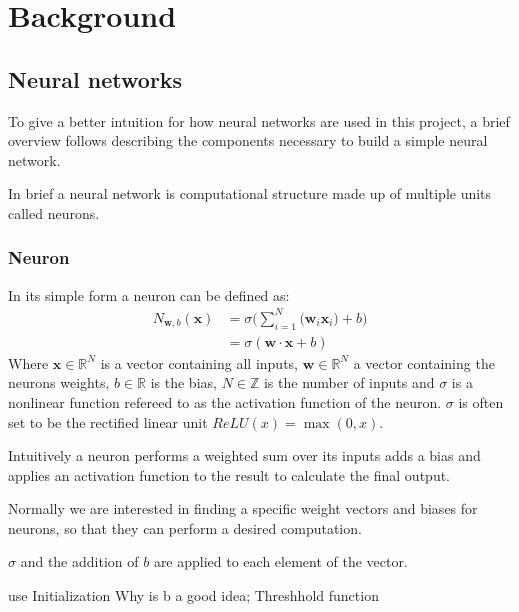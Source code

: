 \newcommand{\neuronSum}[1][N]{
	\sigma\Bigg(\sum_{i=1}^{#1}{\Big(\boldsymbol{w}_i \boldsymbol{x}_i\Big)} + b\Bigg)
}

\chapter{Background}
\section{Neural networks}
To give a better intuition for how neural networks are used in this project, a brief overview follows describing the components necessary to build a simple neural network.

In brief a neural network is computational structure made up of multiple units called neurons.

\subsection{Neuron}
In its simple form a neuron can be defined as:
\begin{equation}
\begin{split}
	N_{\boldsymbol w, b}(\boldsymbol{x}) & = \neuronSum \\
	& = \sigma (\boldsymbol{w} \cdot \boldsymbol{x} + b)
\end{split}
\end{equation}
Where $\boldsymbol{x} \in \mathbb{R}^N$ is a vector containing all inputs, $ \boldsymbol{w} \in \mathbb{R}^N$ a vector containing the neurons weights, $b \in \mathbb{R}$ is the bias, $N \in \mathbb{Z}$ is the number of inputs and $\sigma$ is a nonlinear function refereed to as the activation function of the neuron. $\sigma$ is often set to be the rectified linear unit $ReLU(x) = \max(0, x)$.

Intuitively a neuron performs a weighted sum over its inputs adds a bias and applies an activation function to the result to calculate the final output.

Normally we are interested in finding a specific weight vectors and biases for neurons, so that they can perform a desired computation.

$\sigma$ and the addition of $b$ are applied to each element of the vector.

use
Initialization
Why is b a good idea; Threshhold function

\neuronGraph{p}{$\displaystyle{\neuronSum[3]}$}

\multilayerNetworkGraph[p]

